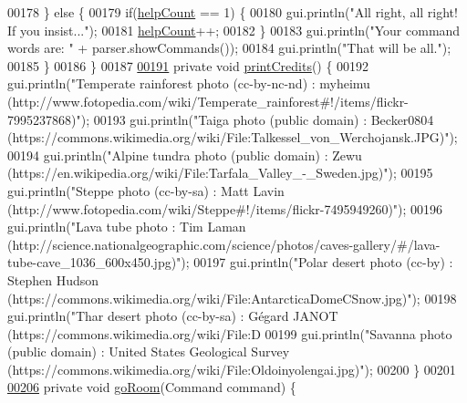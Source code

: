 \begin{DoxyCode}
00178         \} \textcolor{keywordflow}{else} \{
00179             \textcolor{keywordflow}{if}(\hyperlink{classGameEngine_a308a9926d553d53cb4c56c28588f6c62}{helpCount} == 1) \{
00180                 gui.println(\textcolor{stringliteral}{"All right, all right! If you insist..."});
00181                 \hyperlink{classGameEngine_a308a9926d553d53cb4c56c28588f6c62}{helpCount}++;
00182             \}
00183             gui.println(\textcolor{stringliteral}{"Your command words are: "} + parser.showCommands());
00184             gui.println(\textcolor{stringliteral}{"That will be all."});
00185         \}
00186     \}
00187 
\hypertarget{GameEngine_8java_source_l00191}{}\hyperlink{classGameEngine_a0cc83a912708431a667e73c9a8aa3698}{00191}     \textcolor{keyword}{private} \textcolor{keywordtype}{void} \hyperlink{classGameEngine_a0cc83a912708431a667e73c9a8aa3698}{printCredits}() \{
00192         gui.println(\textcolor{stringliteral}{"Temperate rainforest photo (cc-by-nc-nd) : myheimu
       (http://www.fotopedia.com/wiki/Temperate\_rainforest#!/items/flickr-7995237868)"});
00193         gui.println(\textcolor{stringliteral}{"Taiga photo (public domain) : Becker0804
       (https://commons.wikimedia.org/wiki/File:Talkessel\_von\_Werchojansk.JPG)"});
00194         gui.println(\textcolor{stringliteral}{"Alpine tundra photo (public domain) : Zewu
       (https://en.wikipedia.org/wiki/File:Tarfala\_Valley\_-\_Sweden.jpg)"});
00195         gui.println(\textcolor{stringliteral}{"Steppe photo (cc-by-sa) : Matt Lavin
       (http://www.fotopedia.com/wiki/Steppe#!/items/flickr-7495949260)"});
00196         gui.println(\textcolor{stringliteral}{"Lava tube photo : Tim Laman
       (http://science.nationalgeographic.com/science/photos/caves-gallery/#/lava-tube-cave\_1036\_600x450.jpg)"});
00197         gui.println(\textcolor{stringliteral}{"Polar desert photo (cc-by) : Stephen Hudson
       (https://commons.wikimedia.org/wiki/File:AntarcticaDomeCSnow.jpg)"});
00198         gui.println(\textcolor{stringliteral}{"Thar desert photo (cc-by-sa) : Gégard JANOT
       (https://commons.wikimedia.org/wiki/File:D%
00199         gui.println(\textcolor{stringliteral}{"Savanna photo (public domain) : United States Geological Survey
       (https://commons.wikimedia.org/wiki/File:Oldoinyolengai.jpg)"});
00200     \}
00201 
\hypertarget{GameEngine_8java_source_l00206}{}\hyperlink{classGameEngine_a2ec577574f345764435837fc0204b2e0}{00206}     \textcolor{keyword}{private} \textcolor{keywordtype}{void} \hyperlink{classGameEngine_a2ec577574f345764435837fc0204b2e0}{goRoom}(Command command) \{
}
\end{DoxyCode}
